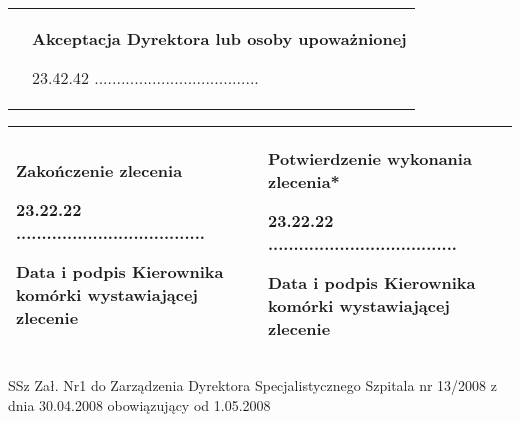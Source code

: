 \documentclass[11pt,a4paper]{article}
\begin{document}
\begin{tabularx}{\linewidth}{|X X|}

&  
{\footnotesize \textbf{Akceptacja Dyrektora lub osoby upoważnionej}}\newline

{} 23.42.42 \hspace{1cm} .....................................


\\ 
\end{tabularx}




\begin{tabularx}{\linewidth}{|X|X|}
\hline
{\footnotesize \textbf{Zakończenie zlecenia}}\newline

{} 23.22.22 \hspace{1cm} ..................................... \newline

{\scriptsize Data i podpis Kierownika komórki wystawiającej zlecenie }
&
{\footnotesize \textbf{Potwierdzenie wykonania zlecenia*}}\newline

{} 23.22.22 \hspace{1cm} ..................................... \newline

{\scriptsize Data i podpis Kierownika komórki wystawiającej zlecenie }
\\ \hline


\end{tabularx}
\begin{center}
{\scriptsize SSz Zał. Nr1 do Zarządzenia Dyrektora Specjalistycznego Szpitala  nr 13/2008 z dnia 30.04.2008 obowiązujący od 1.05.2008}
\end{center}
\end{document}
